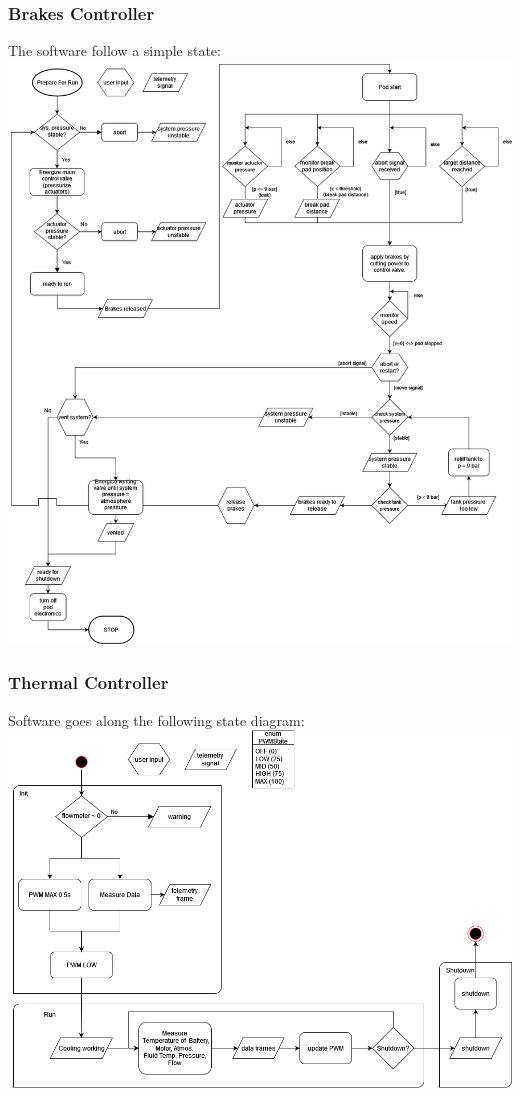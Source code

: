 \subsubsection{Brakes Controller}
The software follow a simple state:
\includegraphics[width=\textwidth]{texfiles/elec/eimg/brakesoftware_ext}
\subsubsection{Thermal Controller}
Software goes along the following state diagram: \\
\includegraphics[width=\textwidth]{texfiles/elec/eimg/thermalsystemsflowchartsoftware}

